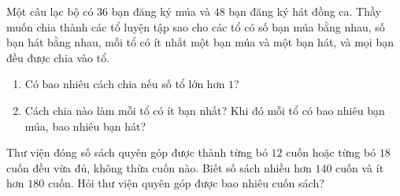 \begin{bt} Một câu lạc bộ có $36$ bạn đăng ký múa và $48$ bạn đăng ký hát đồng ca. Thầy muốn chia thành các tổ luyện tập sao cho các tổ có số bạn múa bằng nhau, số bạn hát bằng nhau, mỗi tổ có ít nhất một bạn múa và một bạn hát, và mọi bạn đều được chia vào tổ.
	\begin{enumerate}
		\item Có bao nhiêu cách chia nếu số tổ lớn hơn $1$?
		\item Cách chia nào làm mỗi tổ có ít bạn nhất? Khi đó mỗi tổ có bao nhiêu bạn múa, bao nhiêu bạn hát?
	\end{enumerate}
\end{bt}

\begin{bt} Thư viện đóng số sách quyên góp được thành từng bó $12$ cuốn hoặc từng bó $18$ cuốn đều vừa đủ, không thừa cuốn nào. Biết số sách nhiều hơn $140$ cuốn và ít hơn $180$ cuốn. Hỏi thư viện quyên góp được bao nhiêu cuốn sách?
\end{bt}

